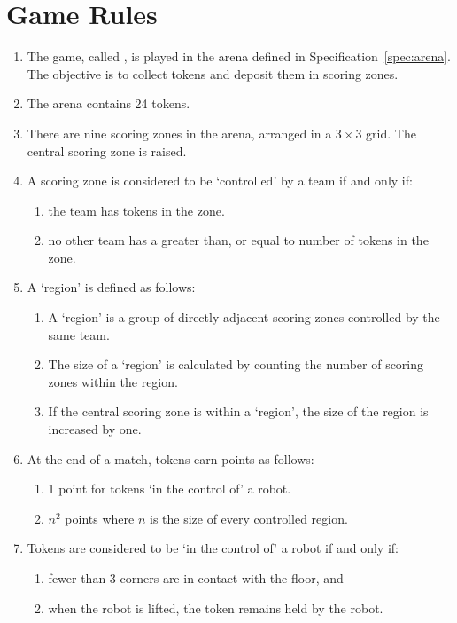 \section{Game Rules}
\label{sec:rules}

\begin{enumerate}
  \item The game, called \emph{\gamename}, is played in the arena defined in
        Specification~\ref{spec:arena}. The objective is to collect tokens and
        deposit them in scoring zones.
  \item The arena contains 24 tokens.
  \item There are nine scoring zones in the arena, arranged in a $3\times3$
        grid. The central scoring zone is raised.
  \item A scoring zone is considered to be `controlled' by a team if and only if:
    \begin{enumerate}
      \item the team has tokens in the zone.
      \item no other team has a greater than, or equal to number of tokens in the zone.
    \end{enumerate}
  \item A `region' is defined as follows:
    \begin{enumerate}
      \item A `region' is a group of directly adjacent scoring zones controlled by the same team.
      \item The size of a `region' is calculated by counting the number of scoring zones within the region.
      \item If the central scoring zone is within a `region', the size of the region is increased by one.
    \end{enumerate}
  \item At the end of a match, tokens earn points as follows:
    \begin{enumerate}
      \item 1 point for tokens `in the control of' a robot.
      \item $n^2$ points where $n$ is the size of every controlled region.
    \end{enumerate}
  \item Tokens are considered to be `in the control of' a robot if and only if:
    \begin{enumerate}
      \item fewer than 3 corners are in contact with the floor, and
      \item when the robot is lifted, the token remains held by the robot.

\end{enumerate}
\end{enumerate}
